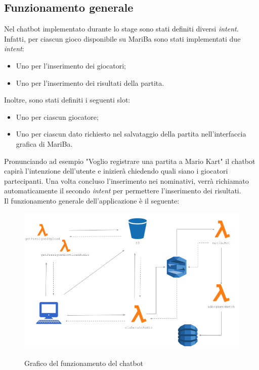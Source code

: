 	\subsection{Funzionamento generale}
	
	\noindent Nel \gls{chatbot} implementato durante lo stage sono stati definiti diversi \emph{intent}. Infatti, per ciascun gioco disponibile su MariBa sono stati implementati due \emph{intent}:
	\begin{itemize}
		\item Uno per l'inserimento dei giocatori;
		\item Uno per l'inserimento dei risultati della partita.
	\end{itemize}
	Inoltre, sono stati definiti i seguenti slot:
	\begin{itemize}
		\item Uno per ciascun giocatore;
		\item Uno per ciascun dato richiesto nel salvataggio della partita nell'interfaccia grafica di MariBa.
	\end{itemize}
	
	\noindent Pronunciando ad esempio "Voglio registrare una partita a Mario Kart" il \gls{chatbot} capirà l'intenzione
	dell'utente e inizierà chiedendo quali siano i giocatori partecipanti. Una volta concluso l'inserimento nei
	nominativi, verrà richiamato automaticamente il secondo \emph{intent} per permettere l'inserimento dei risultati. \\
	
	Il funzionamento generale dell'applicazione è il seguente:
	
	\begin{figure}[H]
		\centering
		\includegraphics[width=12cm]{immagini/funzionamentoLex.png} \\
		\caption{\label{fig:funzionamento-lex} Grafico del funzionamento del chatbot}
	\end{figure}

